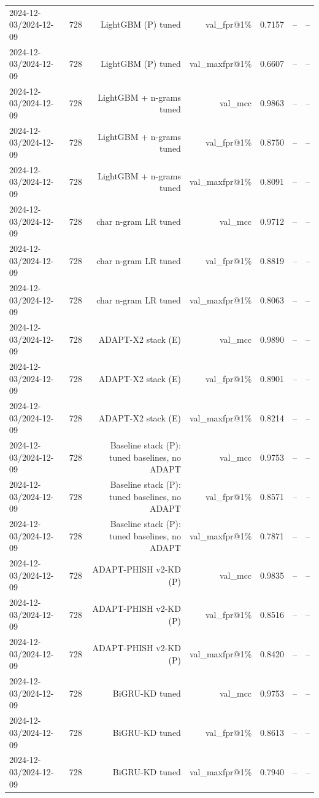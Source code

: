 \begin{table}[t]
\begin{tabular}{llrrrrr}
2024-12-03/2024-12-09 & 728 & LightGBM (P) tuned & val\_fpr@1\% & 0.7157 & -- & -- \\
2024-12-03/2024-12-09 & 728 & LightGBM (P) tuned & val\_maxfpr@1\% & 0.6607 & -- & -- \\
2024-12-03/2024-12-09 & 728 & LightGBM + n-grams tuned & val\_mcc & 0.9863 & -- & -- \\
2024-12-03/2024-12-09 & 728 & LightGBM + n-grams tuned & val\_fpr@1\% & 0.8750 & -- & -- \\
2024-12-03/2024-12-09 & 728 & LightGBM + n-grams tuned & val\_maxfpr@1\% & 0.8091 & -- & -- \\
2024-12-03/2024-12-09 & 728 & char n-gram LR tuned & val\_mcc & 0.9712 & -- & -- \\
2024-12-03/2024-12-09 & 728 & char n-gram LR tuned & val\_fpr@1\% & 0.8819 & -- & -- \\
2024-12-03/2024-12-09 & 728 & char n-gram LR tuned & val\_maxfpr@1\% & 0.8063 & -- & -- \\
2024-12-03/2024-12-09 & 728 & ADAPT-X2 stack (E) & val\_mcc & 0.9890 & -- & -- \\
2024-12-03/2024-12-09 & 728 & ADAPT-X2 stack (E) & val\_fpr@1\% & 0.8901 & -- & -- \\
2024-12-03/2024-12-09 & 728 & ADAPT-X2 stack (E) & val\_maxfpr@1\% & 0.8214 & -- & -- \\
2024-12-03/2024-12-09 & 728 & Baseline stack (P): tuned baselines, no ADAPT & val\_mcc & 0.9753 & -- & -- \\
2024-12-03/2024-12-09 & 728 & Baseline stack (P): tuned baselines, no ADAPT & val\_fpr@1\% & 0.8571 & -- & -- \\
2024-12-03/2024-12-09 & 728 & Baseline stack (P): tuned baselines, no ADAPT & val\_maxfpr@1\% & 0.7871 & -- & -- \\
2024-12-03/2024-12-09 & 728 & ADAPT-PHISH v2-KD (P) & val\_mcc & 0.9835 & -- & -- \\
2024-12-03/2024-12-09 & 728 & ADAPT-PHISH v2-KD (P) & val\_fpr@1\% & 0.8516 & -- & -- \\
2024-12-03/2024-12-09 & 728 & ADAPT-PHISH v2-KD (P) & val\_maxfpr@1\% & 0.8420 & -- & -- \\
2024-12-03/2024-12-09 & 728 & BiGRU-KD tuned & val\_mcc & 0.9753 & -- & -- \\
2024-12-03/2024-12-09 & 728 & BiGRU-KD tuned & val\_fpr@1\% & 0.8613 & -- & -- \\
2024-12-03/2024-12-09 & 728 & BiGRU-KD tuned & val\_maxfpr@1\% & 0.7940 & -- & -- \\

\end{tabular}
\end{table}
